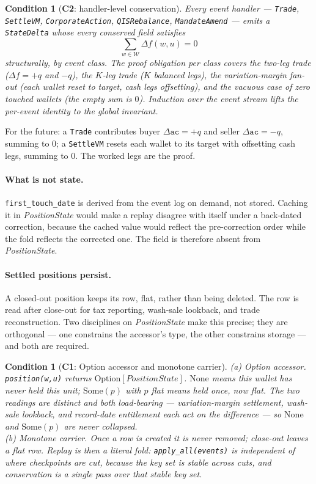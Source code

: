 \documentclass[11pt,a4paper]{article}
\newtheorem{condition}[definition]{Condition}
\begin{document}
\begin{condition}[\textbf{C2}: handler-level conservation]
Every event handler --- \texttt{Trade}, \texttt{SettleVM}, \texttt{CorporateAction},
\texttt{QISRebalance}, \texttt{MandateAmend} --- emits a \texttt{StateDelta} whose every
conserved field satisfies
\[
\sum_{w\in\mathcal{W}} \Delta f(w,u) = 0
\]
structurally, by event class. The proof obligation per class covers the two-leg trade
($\Delta f = +q$ and $-q$), the $K$-leg trade ($K$ balanced legs), the variation-margin
fan-out (each wallet reset to target, cash legs offsetting), and the vacuous case of zero
touched wallets (the empty sum is $0$). Induction over the event stream lifts the per-event
identity to the global invariant.
\end{condition}

\noindent For the future: a \texttt{Trade} contributes buyer $\Delta\texttt{ac}=+q$ and
seller $\Delta\texttt{ac}=-q$, summing to $0$; a \texttt{SettleVM} resets each wallet to its
target with offsetting cash legs, summing to $0$. The worked legs are the proof.

\paragraph{What is not state.}
\texttt{first\_touch\_date} is derived from the event log on demand, not stored. Caching it
in \emph{PositionState} would make a replay disagree with itself under a back-dated
correction, because the cached value would reflect the pre-correction order while the fold
reflects the corrected one. The field is therefore absent from \emph{PositionState}.

\paragraph{Settled positions persist.}
A closed-out position keeps its row, flat, rather than being deleted. The row is read after
close-out for tax reporting, wash-sale lookback, and trade reconstruction. Two disciplines
on \emph{PositionState} make this precise; they are orthogonal --- one constrains the
accessor's type, the other constrains storage --- and both are required.

\begin{condition}[\textbf{C1}: Option accessor and monotone carrier]
\emph{(a) Option accessor.} \texttt{position(w,u)} returns
$\mathrm{Option}[\mathit{PositionState}]$. $\mathrm{None}$ means \emph{this wallet has never
held this unit}; $\mathrm{Some}(p)$ with $p$ flat means \emph{held once, now flat}. The two
readings are distinct and both load-bearing --- variation-margin settlement, wash-sale
lookback, and record-date entitlement each act on the difference --- so $\mathrm{None}$ and
$\mathrm{Some}(p)$ are never collapsed.\\
\emph{(b) Monotone carrier.} Once a row is created it is never removed; close-out leaves a
flat row. Replay is then a literal fold: \texttt{apply\_all(events)} is independent of where
checkpoints are cut, because the key set is stable across cuts, and conservation is a single
pass over that stable key set.
\end{condition}
\end{document}
